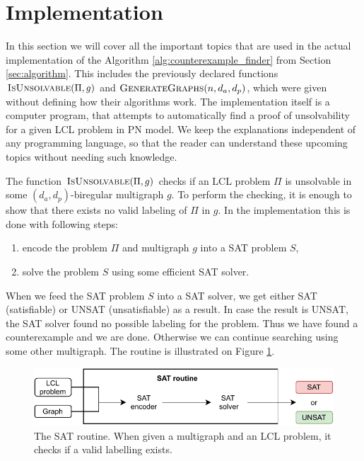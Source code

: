 
\section{Implementation} \label{sec:implementation}
In this section we will cover all the important topics that are used in the actual implementation of the Algorithm \ref{alg:counterexample_finder} from Section \ref{sec:algorithm}.
This includes the previously declared functions $\textsc{IsUnsolvable}(\Pi, g)$ and $\textsc{GenerateGraphs}(n, d_a, d_p)$, which were given without defining how their algorithms work.
The implementation itself is a computer program, that attempts to automatically find a proof of unsolvability for a given LCL problem in PN model.
We keep the explanations independent of any programming language, so that the reader can understand these upcoming topics without needing such knowledge.

The function $\textsc{IsUnsolvable}(\Pi, g)$ checks if an LCL problem $\Pi$ is unsolvable in some $(d_a, d_p)$-biregular multigraph $g$.
To perform the checking, it is enough to show that there exists no valid labeling of $\Pi$ in $g$.
In the implementation this is done with following steps:
\begin{enumerate}
    \item encode the problem $\Pi$ and multigraph $g$ into a SAT problem $S$,
    \item solve the problem $S$ using some efficient SAT solver.
\end{enumerate}
When we feed the SAT problem $S$ into a SAT solver, we get either SAT (satisfiable) or UNSAT (unsatisfiable) as a result.
In case the result is UNSAT, the SAT solver found no possible labeling for the problem.
Thus we have found a counterexample and we are done.
Otherwise we can continue searching using some other multigraph.
The routine is illustrated on Figure \ref{fig:implementation:1}.

\begin{figure}[H]
\centering
\includegraphics[]{diagrams/implementation_idea_diagram2.pdf}
\caption{The SAT routine. When given a multigraph and an LCL problem, it checks if a valid labelling exists.}
\label{fig:implementation:1}
\end{figure}

